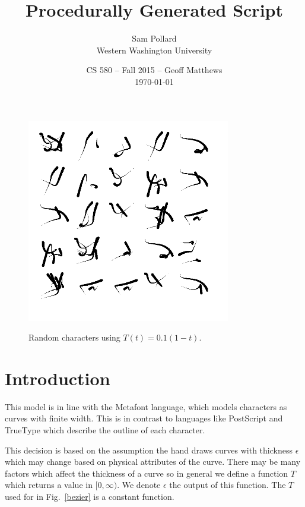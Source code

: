 \documentclass[12pt]{article}
\title{Procedurally Generated Script}
\author{Sam Pollard \\ Western Washington University}
\date{CS 580 -- Fall 2015 -- Geoff Matthews \\ \today}
\begin{document}
\maketitle

\begin{figure}[ht]
	\vspace{-30pt}
	\centering
	\includegraphics[width=3.5in]{sample.png}
	\label{sample}
	\vspace{-18pt}
	\caption{Random characters using $T(t) = 0.1(1-t)$.}
\end{figure}

\section{Introduction}
This model is in line with the Metafont language, which models characters as curves with finite width. This is in contrast to languages like PostScript and TrueType which describe the outline of each character.

This decision is based on the assumption the hand draws curves with thickness $\epsilon$ which may change based on physical attributes of the curve. There may be many factors which affect the thickness of a curve so in general we define a function $T$ which returns a value in $[0,\infty)$. We denote $\epsilon$ the output of this function. The $T$ used for in Fig.~\ref{bezier} is a constant function.
\end{document}
